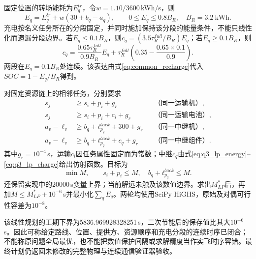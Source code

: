 固定位置的转场能耗为$E_q^{tr}$，令$w=1.10/3600$\,kWh/s，则
\begin{equation}
 E_q=E_q^{tr}+w(30+b_q-a_q),\qquad 0\le E_q\le0.8B_R,
 \quad B_R=3.2\ \mathrm{kWh}.
 \label{eq:q3_lp_energy}
\end{equation}
充电按名义任务所在的分段固定，并同时施加保持该分段的能量条件，不能只线性化而遗漏分段边界。若$E_q\le0.1B_R$，则$c_q=(3.5\tau_R^{full}/B_R)E_q$；若$E_q\ge0.1B_R$，则
\begin{equation}
 c_q=\frac{0.65\tau_R^{full}}{0.9B_R}E_q
       +\tau_R^{full}\left(0.35-\frac{0.65\times0.1}{0.9}\right).
 \label{eq:q3_lp_charge}
\end{equation}
两段在$E_q=0.1B_R$处连续。该表达由式\eqref{eq:common_recharge}代入$SOC=1-E_q/B_R$得到。

对固定资源链上的相邻任务，分别要求
\begin{equation}
\begin{aligned}
 s_j&\ge s_i+p_i+g_r &&\text{（同一运输机）},\\
 s_j&\ge s_i+p_i+c_i+g_r &&\text{（同一运输电池）},\\
 a_v-\ell_v&\ge b_q+t_{p_q}^{back}+300+g_r &&\text{（同一中继机）},\\
 a_v-\ell_v&\ge b_q+t_{p_q}^{back}+c_q+g_r &&\text{（同一中继组件）}.
\end{aligned}
\label{eq:q3_lp_resource}
\end{equation}
其中$g_r=10^{-4}$\,s，运输$c_i$因任务属性固定而为常数；中继$c_q$由式\eqref{eq:q3_lp_energy}--\eqref{eq:q3_lp_charge}给出仿射函数。目标为
\begin{equation}
 \min M,\qquad s_i+p_i\le M,\quad b_q+t_{p_q}^{back}\le M .
 \label{eq:q3_lp_objective}
\end{equation}
还保留实现中的20000\,s变量上界；当前解远未触及该数值边界。求出$M_{LP}^*$后，再加$M\le M_{LP}^*+10^{-6}$\,s并最小化$\sum_q E_q$。两轮均使用SciPy HiGHS，原始及对偶可行性容差为$10^{-8}$。

该线性规划的工期下界为5836.969928328251\,s，二次节能后的保存值比其大$10^{-6}$\,s。因此可称给定路线、位置、提供方、资源顺序和充电分段的连续时序已闭合；不能称原问题全局最优，也不能把数值保护间隔或求解精度当作实飞时序容错。最终计划仍返回未修改的完整物理与连续通信验证器验收。
